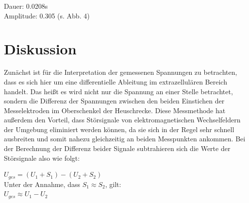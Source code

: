 Dauer: 0.0208s\\
Amplitude: 0.305 (s. Abb. 4)

\section{Diskussion}
Zunächst ist für die Interpretation der gemessenen Spannungen zu betrachten, dass es sich hier um eine differentielle Ableitung im extrazellulären Bereich handelt. Das heißt es wird nicht nur die Spannung an einer Stelle betrachtet, sondern die Differenz der Spannungen zwischen den beiden Einstichen der Messelektroden im Oberschenkel der Heuschrecke. Diese Messmethode hat außerdem den Vorteil, dass Störsignale von elektromagnetischen Wechselfeldern der Umgebung eliminiert werden können, da sie sich in der Regel sehr schnell ausbreiten und somit nahezu gleichzeitig an beiden Messpunkten ankommen. Bei der Berechnung der Differenz beider Signale subtrahieren sich die Werte der Störsignale also wie folgt:
\begin{center}
$U_{ges}= (U_1+S_1) - (U_2 + S_2)$ \\

Unter der Annahme, dass $S_1 \approx S_2$, gilt: \\

$U_{ges} \approx U_1 - U_2$
\end{center}

